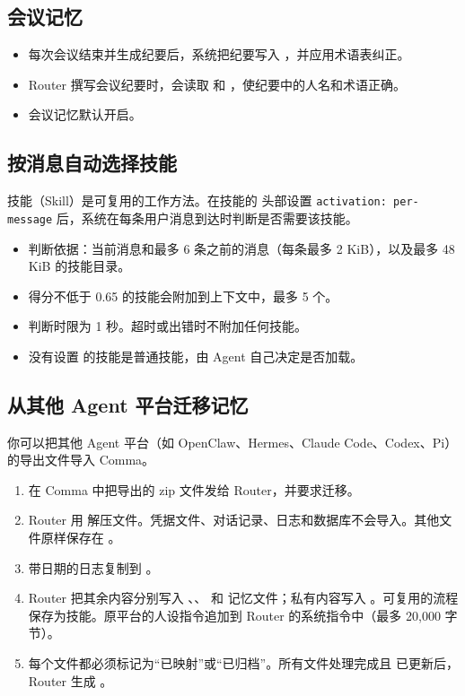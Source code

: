 \documentclass[UTF8,a4paper,11pt]{ctexart}
\begin{document}
\subsection{会议记忆}\label{sec:meeting-memory}

\begin{itemize}
  \item 每次会议结束并生成纪要后，系统把纪要写入 ，并应用术语表纠正。
  \item Router 撰写会议纪要时，会读取  和 ，使纪要中的人名和术语正确。
  \item 会议记忆默认开启。
\end{itemize}

\subsection{按消息自动选择技能}

技能（Skill）是可复用的工作方法。在技能的  头部设置 \texttt{activation:~per-message} 后，系统在每条用户消息到达时判断是否需要该技能。

\begin{itemize}
  \item 判断依据：当前消息和最多 6 条之前的消息（每条最多 2 KiB），以及最多 48 KiB 的技能目录。
  \item 得分不低于 0.65 的技能会附加到上下文中，最多 5 个。
  \item 判断时限为 1 秒。超时或出错时不附加任何技能。
  \item 没有设置  的技能是普通技能，由 Agent 自己决定是否加载。
\end{itemize}

\subsection{从其他 Agent 平台迁移记忆}\label{sec:migration}

你可以把其他 Agent 平台（如 OpenClaw、Hermes、Claude Code、Codex、Pi）的导出文件导入 Comma。

\begin{enumerate}
  \item 在 Comma 中把导出的 zip 文件发给 Router，并要求迁移。
  \item Router 用  解压文件。凭据文件、对话记录、日志和数据库不会导入。其他文件原样保存在 。
  \item 带日期的日志复制到 。
  \item Router 把其余内容分别写入 、、 和  记忆文件；私有内容写入 。可复用的流程保存为技能。原平台的人设指令追加到 Router 的系统指令中（最多 20,000 字节）。
  \item 每个文件都必须标记为“已映射”或“已归档”。所有文件处理完成且  已更新后，Router 生成 。
\end{enumerate}
\end{document}

